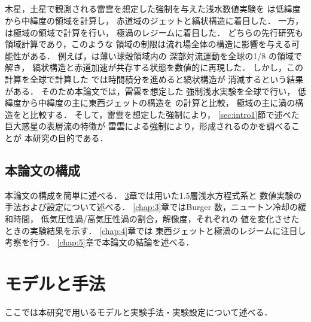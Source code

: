 \documentclass[a4j,12pt,openbib,oneside]{jreport}
\begin{document}
\section{}
\label{sec:intro3}
木星，土星で観測される雷雲を想定した強制を与えた浅水数値実験を
\cite{Showman2007}は低緯度から中緯度の領域を計算し，
赤道域のジェットと縞状構造に着目した．
%
一方，\cite{Brueshaber2019}は極域の領域で計算を行い，
極渦のレジームに着目した．
%
どちらの先行研究も領域計算であり，このような
領域の制限は流れ場全体の構造に影響を与える可能性がある．
%
例えば，\cite{Heimpel2007}は薄い球殻領域内の
深部対流運動を全球の1/8 の領域で解き，
縞状構造と赤道加速が共存する状態を数値的に再現した．
しかし，この計算を全球で計算した
\cite{Takehiro2015}では時間積分を進めると縞状構造が
消滅するという結果がある．
%
そのため本論文では，雷雲を想定した
強制浅水実験を全球で行い，
低緯度から中緯度の主に東西ジェットの構造を
\cite{Showman2007}の計算と比較，
極域の主に渦の構造を\cite{Brueshaber2019}と比較する．
そして，雷雲を想定した強制により，
\ref{sec:intro1}節で述べた巨大惑星の表層流の特徴が
雷雲による強制により，形成されるのかを調べることが
本研究の目的である．
%
\def\intro4{本論文の構成}
\section{\intro4}
\label{sec:intro4}
本論文の構成を簡単に述べる．
\ref{chap:2}章では用いた1.5層浅水方程式系と
数値実験の手法および設定について述べる．
\ref{chap:3}章ではBurger 数，ニュートン冷却の緩和時間，
低気圧性渦/高気圧性渦の割合，解像度，それぞれの
値を変化させたときの実験結果を示す．
\ref{chap:4}章では
東西ジェットと極渦のレジームに注目し考察を行う．
\ref{chap:5}章で本論文の結論を述べる．
%
%
\setcounter{table}{0}
\setcounter{figure}{0}
\def\chap2{モデルと手法}
\chapter{\chap2}
\label{chap:2}
\markright{2 \chap2}
ここでは本研究で用いるモデルと実験手法・実験設定について述べる．
\end{document}
